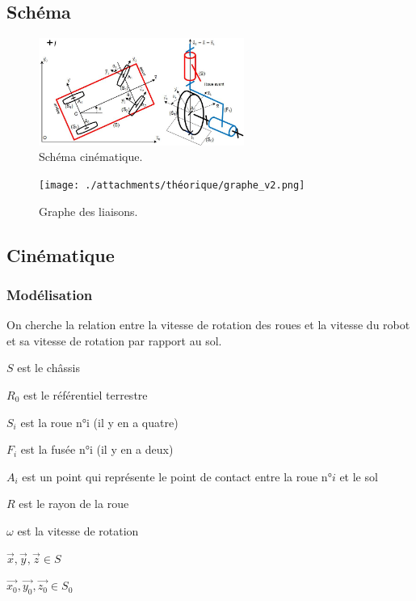 \documentclass[a4paper,12pt]{report}  %
\begin{document}
\subsection{Schéma} 

\begin{figure}[H]
	\centering
	\includegraphics[width=0.6\textwidth]{./attachments/théorique/schéma_modélisation.jpg}
	\caption{Schéma cinématique.}
\end{figure}

\begin{figure}[H]
	\centering
	\texttt{[image: ./attachments/théorique/graphe\_v2.png]}
	\caption{Graphe des liaisons.}
\end{figure}

\subsection{Cinématique} 
\subsubsection{Modélisation} 

On cherche la relation entre la vitesse de rotation des roues et la vitesse du robot et sa vitesse de rotation par rapport au sol. 


$S$ est le châssis 

$R_0$ est le référentiel terrestre 

$S_i$ est la roue n°i (il y en a quatre) 

$F_i$ est la fusée n°i (il y en a deux) 




$A_i$ est un point qui représente le point de contact entre la roue n°$i$ et le sol 

$R$ est le rayon de la roue 

$\omega$ est la vitesse de rotation 




$\vec{x},\vec{y},\vec{z} \in S$ 

$\vec{x_0}, \vec{y_0}, \vec{z_0} \in S_0$ 
\end{document}
